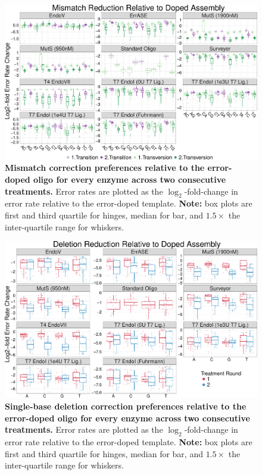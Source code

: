 \documentclass[letterpaper,12pt]{article}
\begin{document}
\clearpage
\begin{figure}[t]
\centering
\includegraphics[width=174mm]{Enzyme_Prefs_MM-1.pdf}
\caption{\small \textbf{Mismatch correction preferences relative to the error-doped oligo for every enzyme across two consecutive treatments.} Error rates are plotted as the $\log_2$-fold-change in error rate relative to the error-doped template. \textbf{Note:} box plots are first and third quartile for hinges, median for bar, and $1.5\times$ the inter-quartile range for whiskers.}
\end{figure}

\clearpage
\begin{figure}[t]
\centering
\includegraphics[width=174mm]{Enzyme_Prefs_Deletions-1.pdf}
\caption{\small \textbf{Single-base deletion correction preferences relative to the error-doped oligo for every enzyme across two consecutive treatments.} Error rates are plotted as the $\log_2$-fold-change in error rate relative to the error-doped template. \textbf{Note:} box plots are first and third quartile for hinges, median for bar, and $1.5\times$ the inter-quartile range for whiskers.}
\end{figure}
\end{document}
